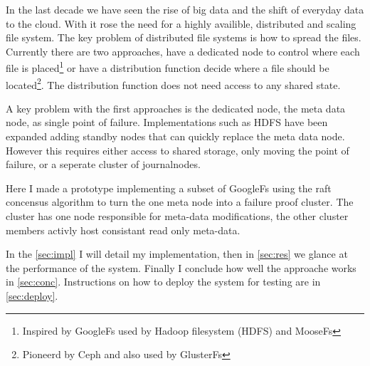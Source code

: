 In the last decade we have seen the rise of big data and the shift of everyday data to the cloud. With it rose the need for a highly availible, distributed and scaling file system. The key problem of distributed file systems is how to spread the files. Currently there are two approaches, have a dedicated node to control where each file is placed\footnote{Inspired by GoogleFs\cite{gfs} used by Hadoop filesystem\cite{hdfs} (HDFS) and MooseFs\cite{moosefs}} or have a distribution function decide where a file should be located\footnote{Pioneerd by Ceph\cite{ceph} and also used by GlusterFs\cite{glusterfs}}. The distribution function does not need access to any shared state.

A key problem with the first approaches is the dedicated node, the meta data node, as single point of failure. Implementations such as HDFS have been expanded adding standby nodes that can quickly replace the meta data node. However this requires either access to shared storage\cite{hdfs_ha_nfs}, only moving the point of failure, or a seperate cluster of journalnodes\cite{hdfs_ha_q}.

Here I made a prototype implementing a subset of GoogleFs using the raft\cite{raft} concensus algorithm to turn the one meta node into a failure proof cluster. The cluster has one node responsible for meta-data modifications, the other cluster members activly host consistant read only meta-data. 

In the \cref{sec:impl} I will detail my implementation, then in \cref{sec:res} we glance at the performance of the system. Finally I conclude how well the approache works in \cref{sec:conc}. Instructions on how to deploy the system for testing are in \cref{sec:deploy}.
